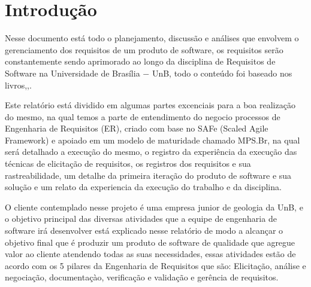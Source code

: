 \chapter{Introdução}

  Nesse documento está todo o planejamento, discussão e análises que envolvem o gerenciamento dos requisitos de um produto de
  software, os requisitos serão constantemente sendo aprimorado ao longo da disciplina de Requisitos de Software na Universidade
  de Brasília $-$ UnB, todo o conteúdo foi baseado nos livros\cite{req01},\cite{req02},\cite{req03}.

  Este relatório está dividido em algumas partes excenciais para a boa realização do mesmo, na qual temos a parte de entendimento do negocio
  processos de Engenharia de Requisitos (ER), criado com base no SAFe (Scaled Agile Framework) e apoiado em um modelo de maturidade chamado
  MPS.Br, na qual será detalhado a execução do mesmo, o registro da experiência da execução das técnicas de elicitação de requisitos, os
  registros dos requisitos e sua rastreabilidade, um detalhe da primeira iteração do produto de software e sua solução e um relato da
  experiencia da execução do trabalho e da disciplina.

  O cliente contemplado nesse projeto é uma empresa junior de geologia da UnB, e o objetivo principal das diversas atividades que a
  equipe de engenharia de software irá desenvolver está explicado nesse relatório de modo a alcançar o objetivo final que é produzir
  um produto de software de qualidade que agregue valor ao cliente atendendo todas as suas necessidades, essas atividades estão de
  acordo com os 5 pilares da Engenharia de Requisitos que são: Elicitação, análise e negociação, documentaçào, verificação e validação
  e gerência de requisitos.

